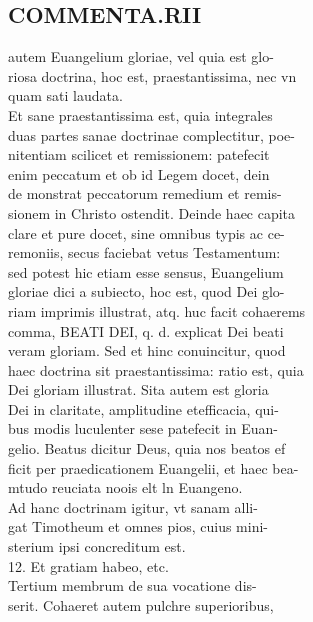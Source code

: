 \documentclass{article}
\begin{document}
\begin{pages}
\section*{COMMENTA.RII \\
                }autem Euangelium gloriae, vel quia est glo- \\
                riosa doctrina, hoc est, praestantissima, nec vn \\
                quam sati laudata. \\
                Et sane praestantissima est, quia integrales \\
                duas partes sanae doctrinae complectitur, poe- \\
                nitentiam scilicet et remissionem: patefecit \\
                enim peccatum et ob id Legem docet, dein \\
                de monstrat peccatorum remedium et remis- \\
                sionem in Christo ostendit. Deinde haec capita \\
                clare et pure docet, sine omnibus typis ac ce- \\
                remoniis, secus faciebat vetus Testamentum: \\
                sed potest hic etiam esse sensus, Euangelium \\
                gloriae dici a subiecto, hoc est, quod Dei glo- \\
                riam imprimis illustrat, atq. huc facit cohaerems \\
                comma, BEATI DEI, q. d. explicat Dei beati \\
                veram gloriam. Sed et hinc conuincitur, quod \\
                haec doctrina sit praestantissima: ratio est, quia \\
                Dei gloriam illustrat. Sita autem est gloria \\
                Dei in claritate, amplitudine etefficacia, qui- \\
                bus modis luculenter sese patefecit in Euan- \\
                gelio. Beatus dicitur Deus, quia nos beatos ef \\
                ficit per praedicationem Euangelii, et haec bea- \\
                mtudo reuciata noois elt ln Euangeno. \\
                Ad hanc doctrinam igitur, vt sanam alli- \\
                gat Timotheum et omnes pios, cuius mini- \\
                sterium ipsi concreditum est. \\
                12. Et gratiam habeo, etc. \\
                Tertium membrum de sua vocatione dis- \\
                serit. Cohaeret autem pulchre superioribus, \\
                

\end{pages}
\end{document}
